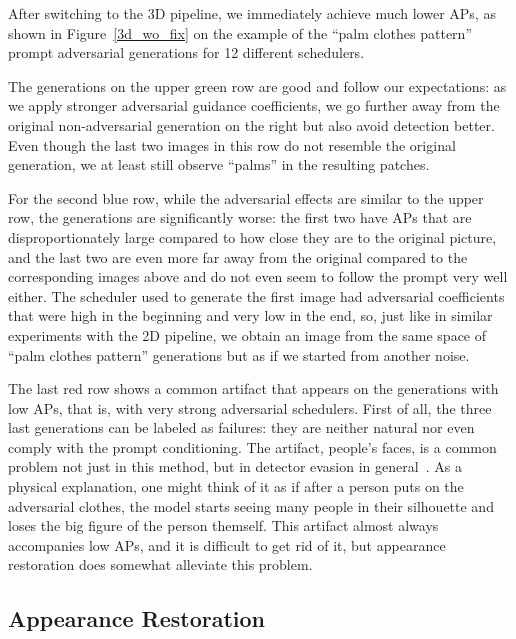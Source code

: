 After switching to the 3D pipeline, we immediately achieve much lower APs, as shown in Figure~\ref{3d_wo_fix} on the example of the ``palm clothes pattern'' prompt adversarial generations for 12 different schedulers. 

The generations on the upper green row are good and follow our expectations: as we apply stronger adversarial guidance coefficients, we go further away from the original non-adversarial generation on the right but also avoid detection better.
Even though the last two images in this row do not resemble the original generation, we at least still observe ``palms'' in the resulting patches. 

For the second blue row, while the adversarial effects are similar to the upper row, the generations are significantly worse: the first two have APs that are disproportionately large compared to how close they are to the original picture, and the last two are even more far away from the original compared to the corresponding images above and do not even seem to follow the prompt very well either. 
The scheduler used to generate the first image had adversarial coefficients that were high in the beginning and very low in the end, so, just like in similar experiments with the 2D pipeline, we obtain an image from the same space of ``palm clothes pattern'' generations but as if we started from another noise. 

The last red row shows a common artifact that appears on the generations with low APs, that is, with very strong adversarial schedulers. 
First of all, the three last generations can be labeled as failures: they are neither natural nor even comply with the prompt conditioning. 
The artifact, people's faces, is a common problem not just in this method, but in detector evasion in general~\cite{texture}.
As a physical explanation, one might think of it as if after a person puts on the adversarial clothes, the model starts seeing many people in their silhouette and loses the big figure of the person themself.
This artifact almost always accompanies low APs, and it is difficult to get rid of it, but appearance restoration does somewhat alleviate this problem.


\subsection{Appearance Restoration}

